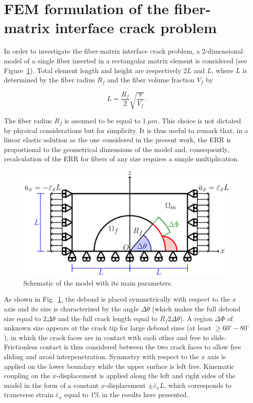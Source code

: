 \documentclass[review]{elsarticle}
\begin{document}
\section{FEM formulation of the fiber-matrix interface crack problem}\label{sec:femmodel}

In order to investigate the fiber-matrix interface crack problem, a 2-dimensional model of a single fiber inserted in a rectangular matrix element is considered (see Figure~\ref{fig:modelschem}). Total element length and height are respectively $2L$ and $L$, where $L$ is determined by the fiber radius $R_{f}$ and the fiber volume fraction $V_{f}$ by

\begin{equation}\label{eq:LVf}
L=\frac{R_{f}}{2}\sqrt{\frac{\pi}{V_{f}}}.
\end{equation}

The fiber radius $R_{f}$ is assumed to be equal to $1\ \mu m$. This choice is not dictated by physical considerations but for simplicity. It is thus useful to remark that, in a linear elastic solution as the one considered in the present work, the ERR is proportional to the geometrical dimensions of the model and, consequently, recalculation of the ERR for fibers of any size requires a simple multiplication.

\begin{figure}[!h]
\centering
\includegraphics[width=\textwidth]{RUC.pdf}
\caption{Schematic of the model with its main parameters.}\label{fig:modelschem}
\end{figure}

As shown in Fig.~\ref{fig:modelschem}, the debond is placed symmetrically with respect to the $x$ axis and its size is characterized by the angle $\Delta\theta$ (which makes the full debond size equal to $2\Delta\theta$ and the full crack length equal to $R_{f}2{\Delta\theta}$). A region $\Delta\Phi$ of unknown size appears at the crack tip for large debond sizes (at least $\geq 60^{\circ}-80^{\circ}$), in which the crack faces are in contact with each other and free to slide. Frictionless contact is thus considered between the two crack faces to allow free sliding and avoid interpenetration. Symmetry with respect to the $x$ axis is applied on the lower boundary while the upper surface is left free. Kinematic coupling on the $x$-displacement is applied along the left and right sides of the model in the form of a constant $x$-displacement $\pm\bar{\varepsilon}_{x} L$, which corresponds to transverse strain $\bar{\varepsilon}_{x}$ equal to $1\%$ in the results here presented.
\end{document}

